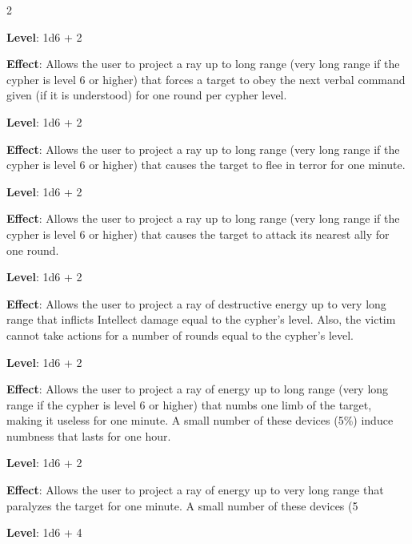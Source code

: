 \begin{multicols}{2}


\textbf{Level}: 1d6 + 2

\textbf{Effect}: Allows the user to project a ray up to long range (very long range if the cypher is level 6 or higher) that forces a target to obey the next verbal command given (if it is understood) for one round per cypher level.


\textbf{Level}: 1d6 + 2

\textbf{Effect}: Allows the user to project a ray up to long range (very long range if the cypher is level 6 or higher) that causes the target to flee in terror for one minute.


\textbf{Level}: 1d6 + 2

\textbf{Effect}: Allows the user to project a ray up to long range (very long range if the cypher is level 6 or higher) that causes the target to attack its nearest ally for one round.


\textbf{Level}: 1d6 + 2

\textbf{Effect}: Allows the user to project a ray of destructive energy up to very long range that inflicts Intellect damage equal to the cypher’s level. Also, the victim cannot take actions for a number of rounds equal to the cypher’s level.


\textbf{Level}: 1d6 + 2

\textbf{Effect}: Allows the user to project a ray of energy up to long range (very long range if the cypher is level 6 or higher) that numbs one limb of the target, making it useless for one minute. A small number of these devices (5\%) induce numbness that lasts for one hour.


\textbf{Level}: 1d6 + 2

\textbf{Effect}: Allows the user to project a ray of energy up to very long range that paralyzes the target for one minute. A small number of these devices (5%


\textbf{Level}: 1d6 + 4


\end{multicols}
